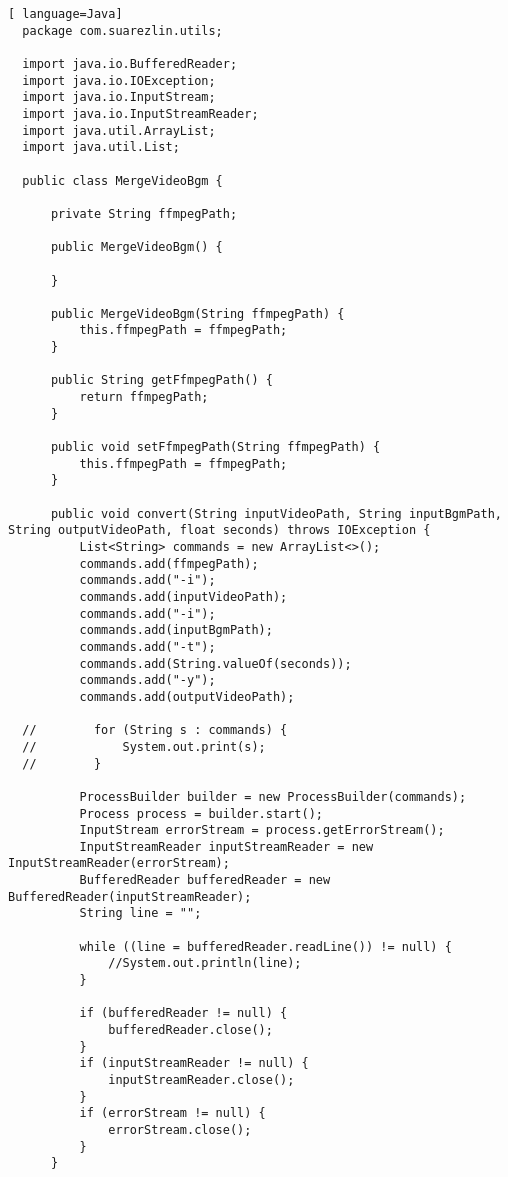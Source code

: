 \begin{lstlisting}[ language=Java]
  package com.suarezlin.utils;

  import java.io.BufferedReader;
  import java.io.IOException;
  import java.io.InputStream;
  import java.io.InputStreamReader;
  import java.util.ArrayList;
  import java.util.List;
  
  public class MergeVideoBgm {
  
      private String ffmpegPath;
  
      public MergeVideoBgm() {
  
      }
  
      public MergeVideoBgm(String ffmpegPath) {
          this.ffmpegPath = ffmpegPath;
      }
  
      public String getFfmpegPath() {
          return ffmpegPath;
      }
  
      public void setFfmpegPath(String ffmpegPath) {
          this.ffmpegPath = ffmpegPath;
      }
  
      public void convert(String inputVideoPath, String inputBgmPath, String outputVideoPath, float seconds) throws IOException {
          List<String> commands = new ArrayList<>();
          commands.add(ffmpegPath);
          commands.add("-i");
          commands.add(inputVideoPath);
          commands.add("-i");
          commands.add(inputBgmPath);
          commands.add("-t");
          commands.add(String.valueOf(seconds));
          commands.add("-y");
          commands.add(outputVideoPath);
  
  //        for (String s : commands) {
  //            System.out.print(s);
  //        }
  
          ProcessBuilder builder = new ProcessBuilder(commands);
          Process process = builder.start();
          InputStream errorStream = process.getErrorStream();
          InputStreamReader inputStreamReader = new InputStreamReader(errorStream);
          BufferedReader bufferedReader = new BufferedReader(inputStreamReader);
          String line = "";
  
          while ((line = bufferedReader.readLine()) != null) {
              //System.out.println(line);
          }
  
          if (bufferedReader != null) {
              bufferedReader.close();
          }
          if (inputStreamReader != null) {
              inputStreamReader.close();
          }
          if (errorStream != null) {
              errorStream.close();
          }
      }
  

\end{lstlisting}

